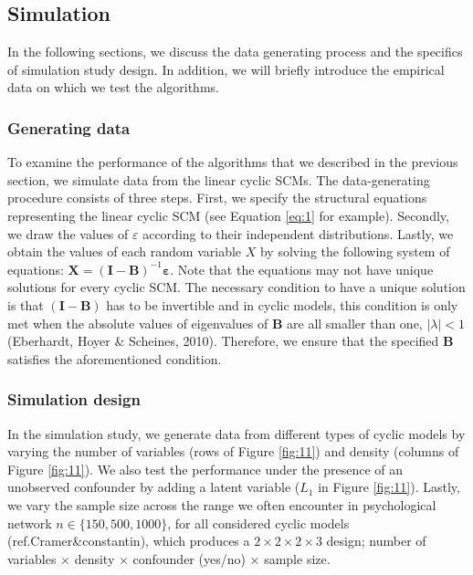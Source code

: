 \documentclass[11pt]{article}
\theoremstyle{definition}
\begin{document}
\subsection{Simulation}

In the following sections, we discuss the data generating process and the specifics of simulation study design. In addition, we will briefly introduce the empirical data on which we test the algorithms.

\subsubsection{Generating data}
To examine the performance of the algorithms that we described in the previous section, we simulate data from the linear cyclic SCMs. The data-generating procedure consists of three steps. First, we specify the structural equations representing the linear cyclic SCM (see Equation \ref{eq:1} for example). Secondly, we draw the values of $\varepsilon$ according to their independent distributions. Lastly, we obtain the values of each random variable $X$ by solving the following system of equations: $\mathbf{X} = (\mathbf{I} - \mathbf{B})^{-1}\mathbf{\varepsilon}$. Note that the equations may not have unique solutions for every cyclic SCM. The necessary condition to have a unique solution is that $(\mathbf{I} - \mathbf{B})$ has to be invertible and in cyclic models, this condition is only met when the absolute values of eigenvalues of $\mathbf{B}$ are all smaller than one, $|\lambda| < 1$ (Eberhardt, Hoyer \& Scheines, 2010). Therefore, we ensure that the specified $\mathbf{B}$ satisfies the aforementioned condition.

\subsubsection{Simulation design}
In the simulation study, we generate data from different types of cyclic models by varying the number of variables (rows of Figure \ref{fig:11}) and density (columns of Figure \ref{fig:11}). We also test the performance under the presence of an unobserved confounder by adding a latent variable ($L_1$ in Figure \ref{fig:11}). Lastly, we vary the sample size across the range we often encounter in psychological network $n \in \{150, 500, 1000\}$, for all considered cyclic models (ref.Cramer\&constantin), which produces a $2 \times 2 \times 2 \times 3$ design; number of variables $\times$ density $\times$ confounder (yes/no) $\times$ sample size.
\end{document}
